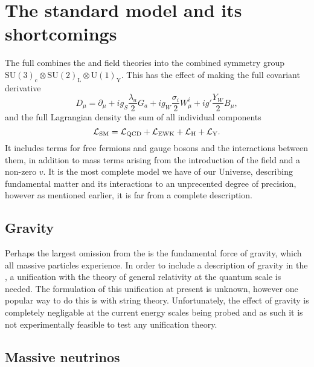 
\section{The standard model and its shortcomings} %
\label{sec:the_full_standard_model}
The full \SM{} combines the \QCD{} and \EWK{} field theories into the combined symmetry group \ensuremath{\mathrm{SU(3)_{c}}\otimes\mathrm{SU(2)_{L}}\otimes\mathrm{U(1)_{Y}}}.
This has the effect of making the full covariant derivative
\begin{equation}
	D_{\mu} = \partial_{\mu}+ig_{S}\frac{\lambda_{a}}{2}G_{a}+ig_{W}\frac{\sigma_{i}}{2}W_{\mu}^{i}+ig'\frac{Y_{W}}{2}B_{\mu},
\end{equation}
and the full Lagrangian density the sum of all individual components
\begin{equation}
	\mathcal{L}_{\mathrm{SM}} = \mathcal{L}_{\mathrm{QCD}} + \mathcal{L}_{\mathrm{EWK}} + \mathcal{L}_{\mathrm{H}} + \mathcal{L}_{\mathrm{Y}}.
\end{equation}
It includes terms for free fermions and gauge bosons and the interactions between them, in addition to mass terms arising from the introduction of the \BEH{} field and a non-zero $v$.
It is the most complete model we have of our Universe, describing fundamental matter and its interactions to an unprecented degree of precision, however as mentioned earlier, it is far from a complete description.

\subsection{Gravity} %
\label{sub:gravity}

Perhaps the largest omission from the \SM{} is the fundamental force of gravity, which all massive particles experience.
In order to include a description of gravity in the \SM{}, a unification with the theory of general relativity at the quantum scale is needed.
The formulation of this unification at present is unknown, however one popular way to do this is with string theory.
Unfortunately, the effect of gravity is completely negligable at the current energy scales being probed and as such it is not experimentally feasible to test any unification theory.  

\subsection{Massive neutrinos} %
\label{sub:massive_neutrinos}

